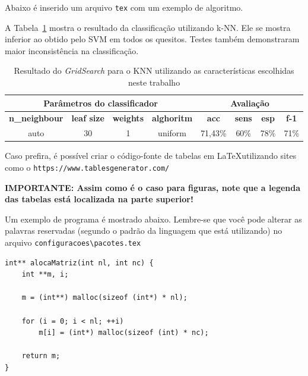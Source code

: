 Abaixo é inserido um arquivo \texttt{tex} com um exemplo de algoritmo. 


A Tabela~\ref{tab:knn} mostra o resultado da classificação utilizando k-NN. Ele se mostra inferior ao obtido pelo SVM em todos os quesitos. Testes também demonstraram maior inconsistência na classificação. 

\begin{table}[!htb]
\centering
\caption{Resultado do \textit{GridSearch} para o KNN utilizando as características escolhidas neste trabalho}
\begin{tabular}{|c|c|c|c|c|c|c|c|}
\hline
\multicolumn{4}{|c|}{Parâmetros do classificador } & \multicolumn{4}{c|}{Avaliação } \\ \hline
\textbf{n\_neighbour}   & \textbf{leaf size} & \textbf{weights} & \textbf{alghoritm} & \textbf{acc} & \textbf{sens} & \textbf{esp} & \textbf{f-1}\\\hline
auto               & 30                 & 1                     & uniform          & 71,43\%           & 60\%                   & 78\%                    & 71\%                     
\\ \hline
\end{tabular}
\label{tab:knn}
\end{table}

Caso prefira, é possível criar o código-fonte de tabelas em \LaTeX utilizando sites como o 
\verb"https://www.tablesgenerator.com/"

\textbf{IMPORTANTE: Assim como é o caso para figuras, note que a legenda das tabelas está localizada na parte superior!}

Um exemplo de programa é mostrado abaixo. Lembre-se que você pode alterar as palavras reservadas (segundo o padrão da linguagem que está utilizando) no arquivo \verb"configuracoes\pacotes.tex"
\begin{lstlisting}
int** alocaMatriz(int nl, int nc) {
    int **m, i;

    m = (int**) malloc(sizeof (int*) * nl);

    for (i = 0; i < nl; ++i)
        m[i] = (int*) malloc(sizeof (int) * nc);

    return m;
}
\end{lstlisting}







